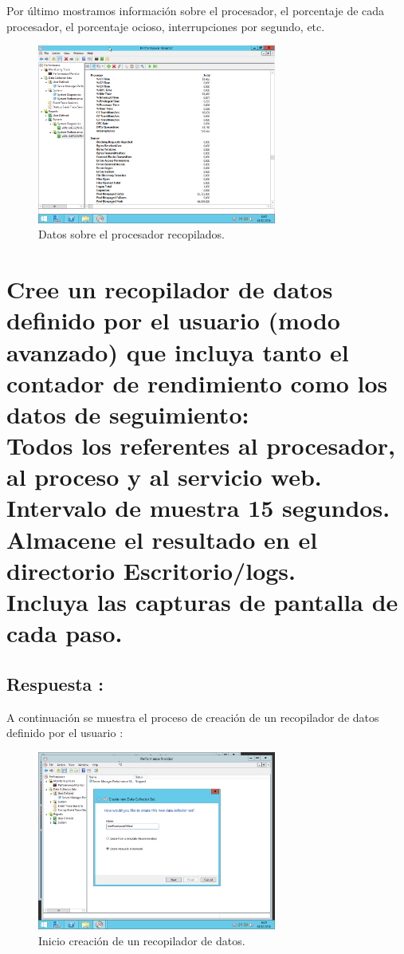 Por último mostramos información sobre el procesador, el porcentaje de cada procesador, el porcentaje ocioso, interrupciones por segundo, etc.
\begin{figure}[H]
	\begin{center}
		\includegraphics[width=0.7\textwidth]{Imagenes/Datos_grafico_diagnostico_3}
		\caption{Datos sobre el procesador recopilados.} \label{fig:13}
	\end{center}
\end{figure}

\section{Cree un recopilador de datos definido por el usuario (modo avanzado) que incluya tanto el contador de rendimiento como los datos de seguimiento:\\
Todos los referentes al procesador, al proceso y al servicio web.\\
Intervalo de muestra 15 segundos.\\
Almacene el resultado en el directorio Escritorio/logs.\\
Incluya las capturas de pantalla de cada paso.}
\subsection{Respuesta : }

A continuación se muestra el proceso de creación de un recopilador de datos definido por el usuario\cite{PERFORM} :

\begin{figure}[H]
	\begin{center}
		\includegraphics[width=0.7\textwidth]{Imagenes/Inicio_creacion_recopilador_datos}
		\caption{Inicio creación de un recopilador de datos.} \label{fig:14}
	\end{center}
\end{figure}

